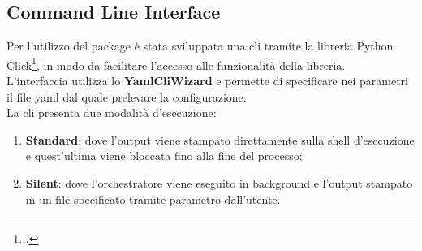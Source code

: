 \subsection{Command Line Interface}
Per l'utilizzo del package è stata sviluppata una \gls{cli} tramite la libreria Python Click\footcite{site:click}, in modo da facilitare l'accesso alle funzionalità della libreria.\\
L'interfaccia utilizza lo \textbf{YamlCliWizard} e permette di specificare nei parametri il file \gls{yaml} dal quale prelevare la configurazione. \\
La \gls{cli} presenta due modalità d'esecuzione:
\begin{enumerate}
	\item \textbf{Standard}: dove l'output viene stampato direttamente sulla \gls{shell} d'esecuzione e quest'ultima viene bloccata fino alla fine del processo;
	\item \textbf{Silent}: dove l'orchestratore viene eseguito in background e l'output stampato in un file specificato tramite parametro dall'utente.
\end{enumerate}
